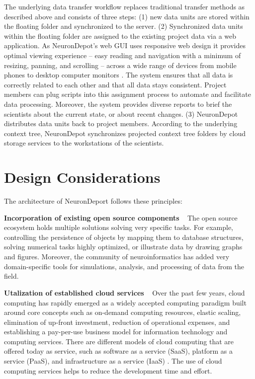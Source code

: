 \documentclass{frontiersSCNS} %
\begin{document}
The underlying data transfer workflow replaces traditional transfer methods as
described above and consists of three steps: (1) new data units are stored
within the floating folder and synchronized to the server. (2) Synchronized
data units within the floating folder are assigned to the existing project data
via a web application. As NeuronDepot's web GUI uses responsive web design it
provides optimal viewing experience -- easy reading and navigation with a
minimum of resizing, panning, and scrolling -- across a wide range of devices
from mobile phones to desktop computer monitors
\citep{marcotte_responsive_2010}. The system ensures that all data is
correctly related to each other and that all data stays consistent. Project
members can plug scripts into this assignment process to automate and
facilitate data processing. Moreover, the system provides diverse reports to
brief the scientists about the current state, or about recent changes. (3)
NeuronDepot distributes data units back to project members. According to the
underlying context tree, NeuronDepot synchronizes projected context tree
folders by cloud storage services to the workstations of the scientists.


\section{Design Considerations}
The architecture of NeuronDeport follows these principles:

\textbf{Incorporation of existing open source components} \texttt{  } The open source ecosystem holds multiple solutions solving very specific tasks.
For example, controlling the persistence of objects by mapping them to database
structures, solving numerical tasks highly optimized, or illustrate data by
drawing graphs and figures. Moreover, the community of neuroinformatics has
added  very domain-specific tools for simulations, analysis, and processing of
data from the field.

\textbf{Utalization of established cloud services} \texttt{  } Over the past
few years, cloud computing has rapidly emerged as a widely accepted computing
paradigm built around core concepts such as on-demand computing resources,
elastic scaling, elimination of up-front investment, reduction of operational
expenses, and establishing a pay-per-use business model for information
technology and computing services. There are different models of cloud
computing that are offered today as service, such as software as a service
(SaaS), platform as a service (PaaS), and infrastructure as a service (IaaS)
\citep{Mell2011, Azodolmolky2013}. The use of cloud computing services helps to
reduce the development time and effort.
\end{document}
